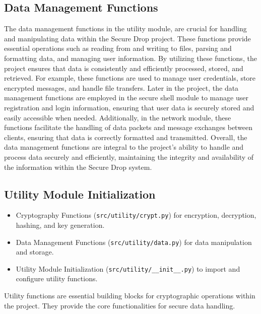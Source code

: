 \documentclass[12pt]{article}
\begin{document}
\subsection{Data Management Functions}


The data management functions in the utility module, are crucial for handling and manipulating data within the Secure Drop project. These functions provide essential operations such as reading from and writing to files, parsing and formatting data, and managing user information. By utilizing these functions, the project ensures that data is consistently and efficiently processed, stored, and retrieved. For example, these functions are used to manage user credentials, store encrypted messages, and handle file transfers. Later in the project, the data management functions are employed in the secure shell module to manage user registration and login information, ensuring that user data is securely stored and easily accessible when needed. Additionally, in the network module, these functions facilitate the handling of data packets and message exchanges between clients, ensuring that data is correctly formatted and transmitted. Overall, the data management functions are integral to the project's ability to handle and process data securely and efficiently, maintaining the integrity and availability of the information within the Secure Drop system.

\subsection{Utility Module Initialization}


\begin{itemize}
    \item Cryptography Functions (\texttt{src/utility/crypt.py}) for encryption, decryption, hashing, and key generation.
    \item Data Management Functions (\texttt{src/utility/data.py}) for data manipulation and storage.
    \item Utility Module Initialization (\texttt{src/utility/\_\_init\_\_.py}) to import and configure utility functions.
\end{itemize}

Utility functions are essential building blocks for cryptographic operations within the project. They provide the core functionalities for secure data handling.
\end{document}
